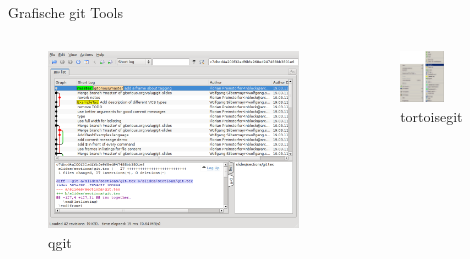 \begin{frame}[allowframebreaks]{Grafische git Tools}
  \begin{columns}
    \begin{column}{0.56\textwidth}
      \begin{figure}
        \includegraphics[width=\textwidth]{img/qgit}
        \caption{qgit}
      \end{figure}
    \end{column}
    \begin{column}{0.56\textwidth}
      \begin{figure}
        \includegraphics[width=0.61\textwidth]{img/tortoisegit}
        \caption{tortoisegit}
      \end{figure}
    \end{column}
  \end{columns}
\end{frame}

